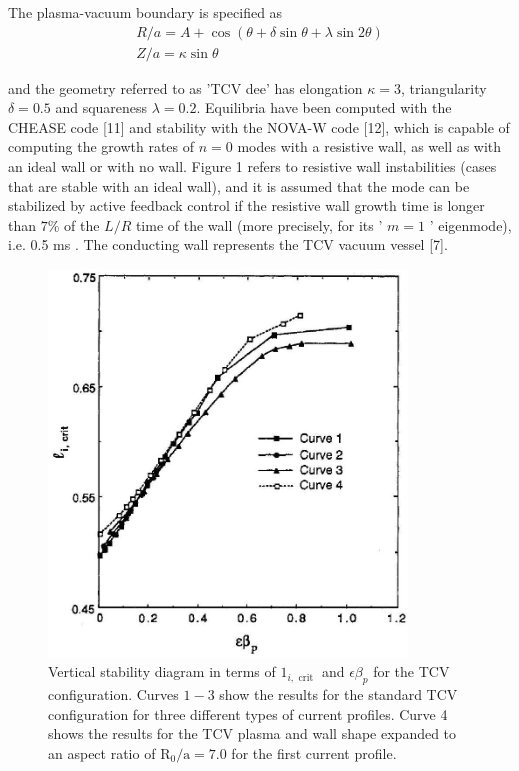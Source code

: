 \documentclass[utf8]{ctexart}
\begin{document}
\begin{sloppypar}
 The plasma-vacuum boundary is specified as
 \begin{gather*}
 	R / a=A+\cos (\theta+\delta \sin \theta+\lambda \sin 2 \theta) \tag{1}\\
 Z / a=\kappa \sin \theta 
 \end{gather*}
 
 

 
 and the geometry referred to as 'TCV dee' has elongation $\kappa=3$, triangularity $\delta=0.5$ and squareness $\lambda=0.2$. Equilibria have been computed with the CHEASE code [11] and stability with the NOVA-W code [12], which is capable of computing the growth rates of $n=0$ modes with a resistive wall, as well as with an ideal wall or with no wall. Figure 1 refers to resistive wall instabilities (cases that are stable with an ideal wall), and it is assumed that the mode can be stabilized by active feedback control if the resistive wall growth time is longer than $7 \%$ of the $L / R$ time of the wall (more precisely, for its ' $m=1$ ' eigenmode), i.e. 0.5 ms . The conducting wall represents the TCV vacuum vessel [7].
 \begin{figure}[H]
 	\centering
 	\includegraphics[max width=0.85\textwidth,max height=0.3\textheight]{2025_01_10_a0135324997886412d98g-3}
 	\caption{Vertical stability diagram in terms of $1_{i, \text { crit }}$ and $\epsilon \beta_{p}$ for the TCV configuration. Curves $1-3$ show the results for the standard TCV configuration for three different types of current profiles. Curve 4 shows the results for the TCV plasma and wall shape expanded to an aspect ratio of $\mathrm{R}_{0} / \mathrm{a}=7.0$ for the first current profile.\\}
 	\label{fig1.}
 \end{figure}
 

\end{sloppypar}
\end{document}
